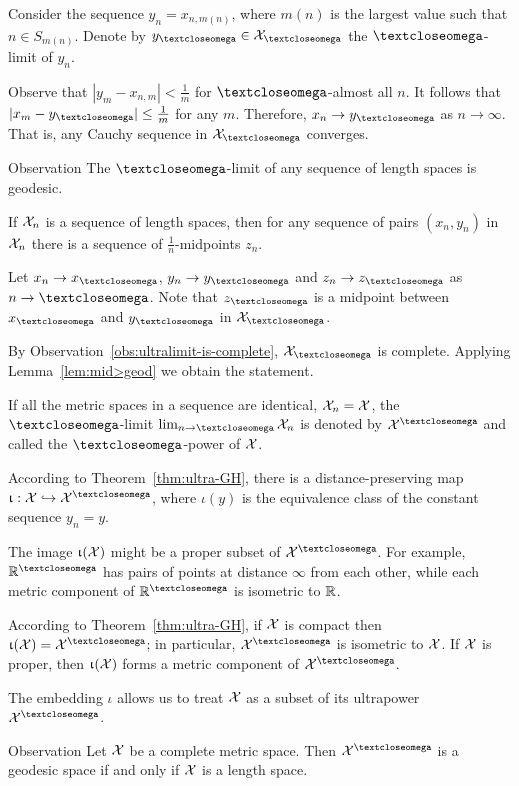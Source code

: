 Consider the sequence $y_n=x_{n,m(n)}$, where $m(n)$ is the largest value such that $n\in S_{m(n)}$.
Denote by $y_\o\in \spc{X}_\o$ the $\o$-limit of $y_n$.

Observe that $|y_m-x_{n,m}|<\tfrac1{m}$ for $\o$-almost all $n$.
It follows that $|x_m-y_\o|\le \tfrac1{m}$ for any $m$.
Therefore, $x_n\to y_\o$ as $n\to \infty$.
That is, any Cauchy sequence in $\spc{X}_\o$ converges.
\qeds


\begin{thm}{Observation}\label{obs:ultralimit-is-geodesic}
The $\o$-limit of any sequence of length spaces is geodesic. 
\end{thm}

If $\mathcal{X}_n$ is a sequence of length spaces, then for any sequence of pairs $(x_n, y_n)$ in $\mathcal{X}_n$ there is a sequence of $\tfrac1n$-midpoints $z_n$.

Let $x_n\to x_\o$, $y_n\to y_\o$ and $z_n\to z_\o$ as $n\to \o$.
Note that $z_\o$ is a midpoint between $x_\o$ and $y_\o$ in $\spc{X}_\o$.

By Observation~\ref{obs:ultralimit-is-complete}, $\spc{X}_\o$ is complete.
Applying Lemma~\ref{lem:mid>geod} we obtain the statement.
\qeds

 If all the metric spaces in a sequence are identical, $\spc{X}_n\z=\spc{X}$, 
the $\o$-limit 
$\lim_{n\to\o}\spc{X}_n$
is denoted by $\spc{X}^\o$
and called the  $\o$-power of $\mathcal{X}$.
 
According to Theorem~\ref{thm:ultra-GH},
there is a distance-preserving map
$\iota:\spc{X}\hookrightarrow \spc{X}^\o$, where $\iota(y)$ is the equivalence class of the constant sequence $y_n=y$. 

The image $\upiota(\mathcal{X})$ might be a proper subset of $\spc{X}^\o$.
For example, $\RR^\o$ has pairs of points at distance $\infty$ from each other, while each metric component of $\RR^\o$ is isometric to $\mathbb{R}$.

According to Theorem~\ref{thm:ultra-GH}, 
if $\mathcal{X}$ is compact then $\iota(\spc{X})=\spc{X}^\o$;
in particular, $\spc{X}^\o$ is isometric to $\mathcal{X}$.
If $\mathcal{X}$ is proper, then $\upiota(\mathcal{X})$ forms a metric component of $\spc{X}^\o$.

The embedding $\iota$ allows us to treat $\mathcal{X}$ as a subset of its ultrapower $\spc{X}^\o$. 

\begin{thm}{Observation}\label{obs:ultrapower-is-geodesic}
Let $\mathcal{X}$ be a complete metric space. 
Then $\spc{X}^\o$ is a geodesic space if and only if $\mathcal{X}$ is a length space.
\end{thm}

